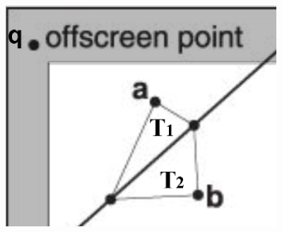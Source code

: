 \documentclass[letterpaper, 8pt]{extarticle}
\begin{document}
\begin{multicols*}{4}









\includegraphics[width=.3\linewidth]{rasterize-triangle-edge.png}


\end{multicols*}
\end{document}
